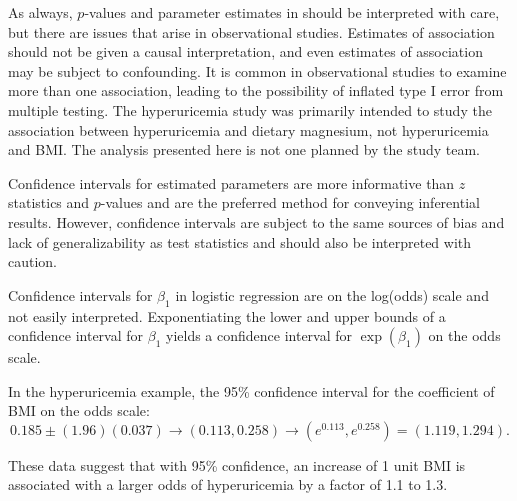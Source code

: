 As always, $p$-values and parameter estimates in should be interpreted with care, but there are issues that arise in observational studies.  Estimates of association should not be given a causal interpretation, and even estimates of association may be subject to confounding. It is common in observational studies to examine more than one association, leading to the possibility of inflated type I error from multiple testing. The hyperuricemia study was primarily intended to study the association between hyperuricemia and dietary magnesium, not hyperuricemia and BMI. The analysis presented here is not one planned by the study team. 

Confidence intervals for estimated parameters are more informative than $z$ statistics and $p$-values and are the preferred method for conveying inferential results.  However, confidence intervals are subject to the same sources of bias and lack of generalizability as test statistics and should also be interpreted with caution.

Confidence intervals for $\beta_1$ in logistic regression are on the log(odds) scale and not easily interpreted. Exponentiating the lower and upper bounds of a confidence interval for $\beta_1$ yields a confidence interval for $\exp(\beta_1)$ on the odds scale.

In the hyperuricemia example, the 95\% confidence interval for the coefficient of BMI on the odds scale:
\[
  0.185 \pm (1.96)(0.037) \longrightarrow (0.113, 0.258) \longrightarrow (e^{0.113}, e^{0.258}) = (1.119, 1.294).
\]

These data suggest that with 95\% confidence, an increase of 1 unit BMI is associated with a larger odds of hyperuricemia by a factor of 1.1 to 1.3. 

